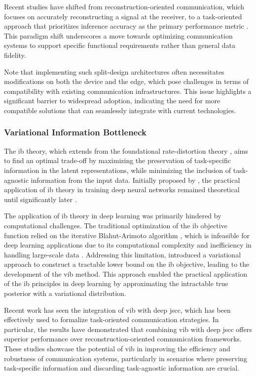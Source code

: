 Recent studies have shifted from reconstruction-oriented communication, which focuses on accurately reconstructing a signal at the receiver, to a task-oriented approach that prioritizes inference accuracy as the primary performance metric \cite{Dubois_2021_LCf, Shao_2021_BGA, Shao_2022_LTO, Shao_2020_BAE, Shao_2023_TOC}. This paradigm shift underscores a move towards optimizing communication systems to support specific functional requirements rather than general data fidelity.

Note that implementing such split-design architectures often necessitates modifications on both the device and the edge, which pose challenges in terms of compatibility with existing communication infrastructures. This issue highlights a significant barrier to widespread adoption, indicating the need for more compatible solutions that can seamlessly integrate with current technologies.


\subsubsection{Variational Information Bottleneck}
The \gls{ib} theory, which extends from the foundational rate-distortion theory \cite{Cover_1991_EoI}, aims to find an optimal trade-off by maximizing the preservation of task-specific information in the latent representations, while minimizing the inclusion of task-agnostic information from the input data. Initially proposed by \cite{Tishby_1999_TIB}, the practical application of \gls{ib} theory in training deep neural networks remained theoretical until significantly later \cite{Tishby_2015_Dla}.

The application of \gls{ib} theory in deep learning was primarily hindered by computational challenges. The traditional optimization of the \gls{ib} objective function relied on the iterative Blahut-Arimoto algorithm \cite{Arimoto_1972_Aaf, Blahut_1972_Coc}, which is infeasible for deep learning applications due to its computational complexity and inefficiency in handling large-scale data \cite{Tishby_2015_Dla}. Addressing this limitation, \cite{Alemi_2017_DVI} introduced a variational approach to construct a tractable lower bound on the \gls{ib} objective, leading to the development of the \gls{vib} method. This approach enabled the practical application of the \gls{ib} principles in deep learning by approximating the intractable true posterior with a variational distribution.

Recent work has seen the integration of \gls{vib} with deep \gls{jscc}, which has been effectively used to formalize task-oriented communication strategies. In particular, the results \cite{Shao_2022_LTO, Shao_2023_TOC} have demonstrated that combining \gls{vib} with deep \gls{jscc} offers superior performance over reconstruction-oriented communication frameworks. These studies showcase the potential of \gls{vib} in improving the efficiency and robustness of communication systems, particularly in scenarios where preserving task-specific information and discarding task-agnostic information are crucial.

